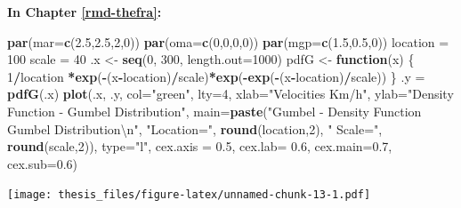 \documentclass[12pt,oneside]{reedthesis}
\newenvironment{Shaded}{\begin{snugshade}}{\end{snugshade}}
\newcommand{\CharTok}[1]{\textcolor[rgb]{0.31,0.60,0.02}{#1}}
\newcommand{\ControlFlowTok}[1]{\textcolor[rgb]{0.13,0.29,0.53}{\textbf{#1}}}
\newcommand{\DataTypeTok}[1]{\textcolor[rgb]{0.13,0.29,0.53}{#1}}
\newcommand{\DecValTok}[1]{\textcolor[rgb]{0.00,0.00,0.81}{#1}}
\newcommand{\FloatTok}[1]{\textcolor[rgb]{0.00,0.00,0.81}{#1}}
\newcommand{\KeywordTok}[1]{\textcolor[rgb]{0.13,0.29,0.53}{\textbf{#1}}}
\newcommand{\NormalTok}[1]{#1}
\newcommand{\OperatorTok}[1]{\textcolor[rgb]{0.81,0.36,0.00}{\textbf{#1}}}
\newcommand{\StringTok}[1]{\textcolor[rgb]{0.31,0.60,0.02}{#1}}
\begin{document}
\textbf{In Chapter \ref{rmd-thefra}:}
\begin{Shaded}
\begin{Highlighting}[]
\KeywordTok{par}\NormalTok{(}\DataTypeTok{mar=}\KeywordTok{c}\NormalTok{(}\FloatTok{2.5}\NormalTok{,}\FloatTok{2.5}\NormalTok{,}\DecValTok{2}\NormalTok{,}\DecValTok{0}\NormalTok{))}
\KeywordTok{par}\NormalTok{(}\DataTypeTok{oma=}\KeywordTok{c}\NormalTok{(}\DecValTok{0}\NormalTok{,}\DecValTok{0}\NormalTok{,}\DecValTok{0}\NormalTok{,}\DecValTok{0}\NormalTok{))}
\KeywordTok{par}\NormalTok{(}\DataTypeTok{mgp=}\KeywordTok{c}\NormalTok{(}\FloatTok{1.5}\NormalTok{,}\FloatTok{0.5}\NormalTok{,}\DecValTok{0}\NormalTok{))}
\NormalTok{location =}\StringTok{ }\DecValTok{100}
\NormalTok{scale =}\StringTok{ }\DecValTok{40}
\NormalTok{.x <-}\StringTok{ }\KeywordTok{seq}\NormalTok{(}\DecValTok{0}\NormalTok{, }\DecValTok{300}\NormalTok{, }\DataTypeTok{length.out=}\DecValTok{1000}\NormalTok{)}
\NormalTok{pdfG <-}\StringTok{ }\ControlFlowTok{function}\NormalTok{(x) \{}
  \DecValTok{1}\OperatorTok{/}\NormalTok{location }\OperatorTok{*}\KeywordTok{exp}\NormalTok{(}\OperatorTok{-}\NormalTok{(x}\OperatorTok{-}\NormalTok{location)}\OperatorTok{/}\NormalTok{scale)}\OperatorTok{*}\KeywordTok{exp}\NormalTok{(}\OperatorTok{-}\KeywordTok{exp}\NormalTok{(}\OperatorTok{-}\NormalTok{(x}\OperatorTok{-}\NormalTok{location)}\OperatorTok{/}\NormalTok{scale))}
\NormalTok{  \}}
\NormalTok{.y =}\StringTok{ }\KeywordTok{pdfG}\NormalTok{(.x)}
\KeywordTok{plot}\NormalTok{(.x, .y, }\DataTypeTok{col=}\StringTok{"green"}\NormalTok{, }\DataTypeTok{lty=}\DecValTok{4}\NormalTok{, }
     \DataTypeTok{xlab=}\StringTok{"Velocities Km/h"}\NormalTok{, }\DataTypeTok{ylab=}\StringTok{"Density Function - Gumbel Distribution"}\NormalTok{, }
     \DataTypeTok{main=}\KeywordTok{paste}\NormalTok{(}\StringTok{"Gumbel - Density Function Gumbel Distribution}\CharTok{\textbackslash{}n}\StringTok{"}\NormalTok{, }\StringTok{"Location="}\NormalTok{, }
     \KeywordTok{round}\NormalTok{(location,}\DecValTok{2}\NormalTok{), }\StringTok{" Scale="}\NormalTok{, }\KeywordTok{round}\NormalTok{(scale,}\DecValTok{2}\NormalTok{)), }\DataTypeTok{type=}\StringTok{"l"}\NormalTok{, }
     \DataTypeTok{cex.axis =} \FloatTok{0.5}\NormalTok{, }\DataTypeTok{cex.lab=} \FloatTok{0.6}\NormalTok{, }\DataTypeTok{cex.main=}\FloatTok{0.7}\NormalTok{, }\DataTypeTok{cex.sub=}\FloatTok{0.6}\NormalTok{)}
\end{Highlighting}
\end{Shaded}
\texttt{[image: thesis\_files/figure-latex/unnamed-chunk-13-1.pdf]}
\end{document}
